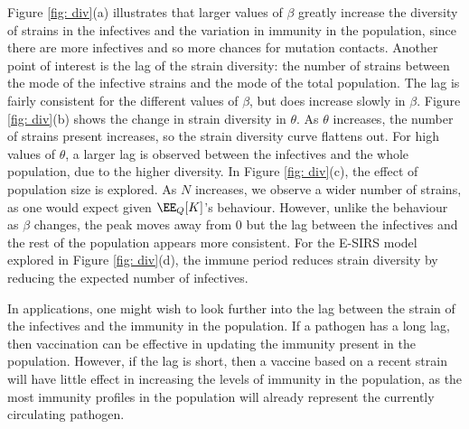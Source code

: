\documentclass[review]{elsarticle}
\begin{document}
Figure \ref{fig: div}(a) illustrates that larger values of $\beta$ greatly increase the diversity of strains in the infectives and the variation in immunity in the population, since there are more infectives and so more chances for mutation contacts. Another point of interest is the lag of the strain diversity: the number of strains between the mode of the infective strains and the mode of the total population. The lag is fairly consistent for the different values of $\beta$, but does increase slowly in $\beta$. Figure \ref{fig: div}(b) shows the change in strain diversity in $\theta$. As $\theta$ increases, the number of strains present increases, so the strain diversity curve flattens out. For high values of $\theta$, a larger lag is observed between the infectives and the whole population, due to the higher diversity. In Figure \ref{fig: div}(c), the effect of population size is explored. As $N$ increases, we observe a wider number of strains, as one would expect given $\EE_Q[K]$'s behaviour. However, unlike the behaviour as $\beta$ changes, the peak moves away from 0 but the lag between the infectives and the rest of the population appears more consistent. For the E-SIRS model explored in Figure \ref{fig: div}(d), the immune period reduces strain diversity by reducing the expected number of infectives.

In applications, one might wish to look further into the lag between the strain of the infectives and the immunity in the population. If a pathogen has a long lag, then vaccination can be effective in updating the immunity present in the population. However, if the lag is short, then a vaccine based on a recent strain will have little effect in increasing the levels of immunity in the population, as the most immunity profiles in the population will already represent the currently circulating pathogen.
\end{document}
